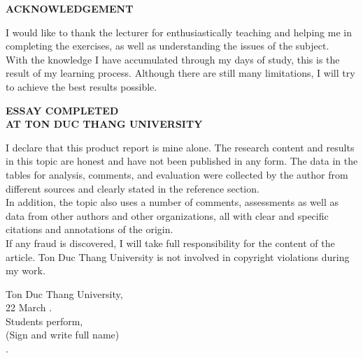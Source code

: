 \begin{center}
	\Large{\textbf{ACKNOWLEDGEMENT}}
\end{center}

	I would like to thank the lecturer \gvhd \mbox{} for enthusiastically teaching and helping me in completing the exercises, as well as understanding the issues of the subject.\\
	
	With the knowledge I have accumulated through my days of study, this is the result of my learning process. Although there are still many limitations, I will try to achieve the best results possible.\\
	\newpage
\begin{center}
	\Large{\textbf{ESSAY COMPLETED}} \\
	\Large{\textbf{AT TON DUC THANG UNIVERSITY}} \\
\end{center}

I declare that this product report is mine alone. The research content and results in this topic are honest and have not been published in any form. The data in the tables for analysis, comments, and evaluation were collected by the author from different sources and clearly stated in the reference section.\\

In addition, the topic also uses a number of comments, assessments as well as data from other authors and other organizations, all with clear and specific citations and annotations of the origin.\\

If any fraud is discovered, I will take full responsibility for the content of the article. Ton Duc Thang University is not involved in copyright violations during my work.\\

\begin{center}
	\hspace*{7cm}Ton Duc Thang University,\\
	\hspace*{7cm}22 March \nam.\\
	\hspace*{7cm}Students perform,\\
	\hspace*{7cm}(Sign and write full name)\\
	\vspace*{0.2cm}
	\vspace*{2cm}
	\hspace*{7cm}\tacgia.
\end{center}		

